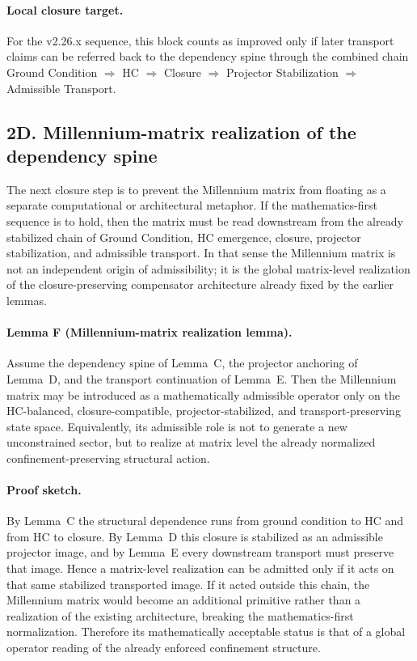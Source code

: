\documentclass[12pt,a4paper]{article}
\begin{document}
\paragraph{Local closure target.}
For the v2.26.x sequence, this block counts as improved only if later transport
claims can be referred back to the dependency spine through the combined chain
Ground Condition $\Rightarrow$ HC $\Rightarrow$ Closure $\Rightarrow$
Projector Stabilization $\Rightarrow$ Admissible Transport.


\subsection*{2D. Millennium-matrix realization of the dependency spine}
The next closure step is to prevent the Millennium matrix from floating as a
separate computational or architectural metaphor. If the mathematics-first
sequence is to hold, then the matrix must be read downstream from the already
stabilized chain of Ground Condition, HC emergence, closure, projector
stabilization, and admissible transport. In that sense the Millennium matrix is
not an independent origin of admissibility; it is the global matrix-level
realization of the closure-preserving compensator architecture already fixed by
the earlier lemmas.

\paragraph{Lemma F (Millennium-matrix realization lemma).}
Assume the dependency spine of Lemma~C, the projector anchoring of Lemma~D, and
the transport continuation of Lemma~E. Then the Millennium matrix may be
introduced as a mathematically admissible operator only on the HC-balanced,
closure-compatible, projector-stabilized, and transport-preserving state space.
Equivalently, its admissible role is not to generate a new unconstrained sector,
but to realize at matrix level the already normalized confinement-preserving
structural action.

\paragraph{Proof sketch.}
By Lemma~C the structural dependence runs from ground condition to HC and from
HC to closure. By Lemma~D this closure is stabilized as an admissible projector
image, and by Lemma~E every downstream transport must preserve that image.
Hence a matrix-level realization can be admitted only if it acts on that same
stabilized transported image. If it acted outside this chain, the Millennium
matrix would become an additional primitive rather than a realization of the
existing architecture, breaking the mathematics-first normalization. Therefore
its mathematically acceptable status is that of a global operator reading of the
already enforced confinement structure.
\end{document}
